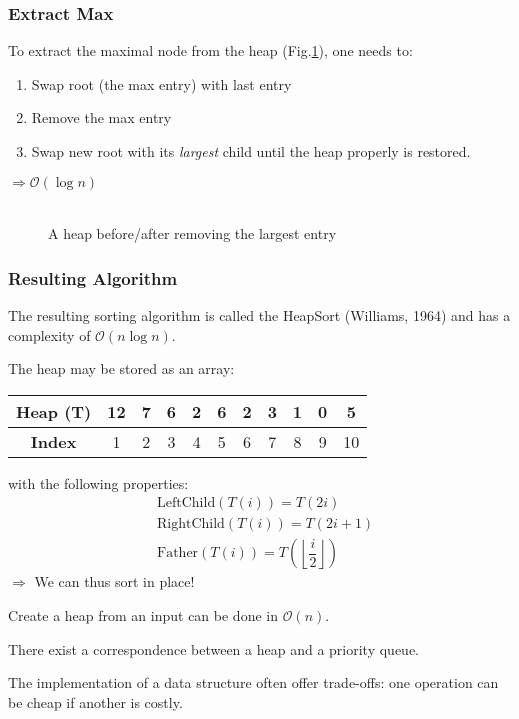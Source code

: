 \subsubsection{Extract Max} To extract the maximal node from the heap (Fig.\ref{cm2:tree4-5}), one needs to:
\begin{enumerate}
\item Swap root (the max entry) with last entry
\item Remove the max entry
\item Swap new root with its \emph{largest} child until the heap properly is restored.
\end{enumerate}
$\Rightarrow \mathcal{O}(\log n)$
\\ \\

\begin{figure}[htbp]
\centering
{}
\caption{A heap before/after removing the largest entry}
\label{cm2:tree4-5}
\end{figure}

\subsubsection{Resulting Algorithm}

The resulting sorting algorithm is called the HeapSort (Williams, 1964) and has a complexity of $\mathcal{O}(n\log n)$.

\begin{remark} The heap may be stored as an array: \\
\begin{center}
\begin{tabular}{|c|c|c|c|c|c|c|c|c|c|c|}
   \hline
   \textbf{Heap (T)} & 12 & 7 & 6 & 2 & 6 & 2 & 3 & 1 & 0 & 5 \\
   \hline 
   \textbf{Index} & 1 & 2 & 3 & 4 & 5 & 6 & 7 & 8 & 9 & 10 \\
   \hline
\end{tabular}
\end{center} 
\vspace*{0.4 cm} 
with the following properties:
\begin{align*}
& \text{LeftChild}(T(i)) = T(2i) \\
& \text{RightChild}(T(i)) = T(2i+1) \\
& \text{Father}(T(i)) = T\left( \left\lfloor\dfrac{i}{2}\right\rfloor \right)
\end{align*}
$\Rightarrow $ We can thus sort in place!
\end{remark}
\begin{remark} Create a heap from an input can be done in $\mathcal{O}(n)$.
\end{remark}
\begin{remark} There exist a correspondence between a heap and a priority queue.
\end{remark}
\begin{remark} The implementation of a data structure often offer trade-offs: one operation can be cheap if another is costly. 
\end{remark}

